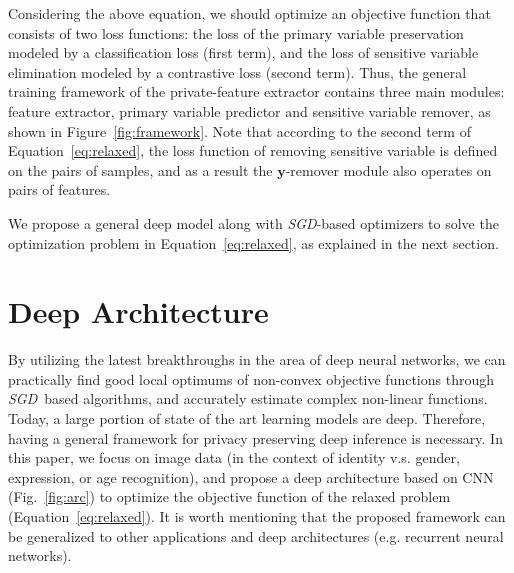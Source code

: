 \documentclass[10pt,journal,compsoc]{IEEEtran}
\newcommand{\alert}[1]{\textcolor{purple}{#1}}
\begin{document}
Considering the above equation, we should optimize an objective function that consists of two loss functions: the loss of the primary variable preservation modeled by a classification loss (first term), and the loss of sensitive variable elimination modeled by a contrastive loss (second term). Thus, the general training framework of the private-feature extractor contains three main modules: feature extractor, primary variable predictor and sensitive variable remover, as shown in Figure~\ref{fig:framework}. Note that according to the second term of Equation~\ref{eq:relaxed}, the loss function of removing sensitive variable is defined on the pairs of samples, and as a result the $\textbf{y}$-remover module also operates on pairs of features.

We propose a general deep model along with \emph{SGD}-based optimizers to solve the optimization problem in Equation~\ref{eq:relaxed}, as explained in the next section. 

\section{Deep Architecture}\label{sec:deep}%

By utilizing the latest breakthroughs in the area of deep neural networks, we can practically find good local optimums of non-convex objective functions through \emph{SGD}~based algorithms, and accurately estimate complex non-linear functions. Today, a large portion of state of the art learning models are deep. Therefore, having a general framework for privacy preserving deep inference is necessary. %
In this paper, we focus on image data (in the context of identity v.s. gender, expression, or age recognition), and propose a deep architecture based on CNN (Fig.~\ref{fig:arc}) to optimize the objective function of the relaxed problem (Equation~\ref{eq:relaxed}). It is worth mentioning that the proposed framework can be generalized to other applications and deep architectures (e.g. recurrent neural networks).
\end{document}
